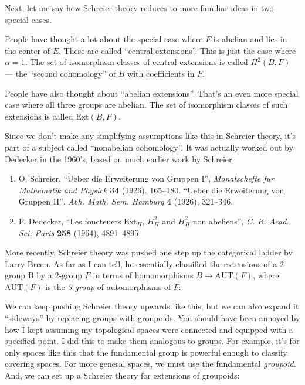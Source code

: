 \documentclass{article}
\def\tightlist{}
\renewcommand{\texttt}[1]{%
  \begingroup
  \ttfamily
  \begingroup\lccode`~=`/\lowercase{\endgroup\def~}{/\discretionary{}{}{}}%
  \begingroup\lccode`~=`[\lowercase{\endgroup\def~}{[\discretionary{}{}{}}%
  \begingroup\lccode`~=`.\lowercase{\endgroup\def~}{.\discretionary{}{}{}}%
  \catcode`/=\active\catcode`[=\active\catcode`.=\active
  \scantokens{#1\noexpand}%
  \endgroup
}
\begin{document}
Next, let me say how Schreier theory reduces to more familiar ideas in
two special cases.

People have thought a lot about the special case where \(F\) is abelian
and lies in the center of \(E\). These are called ``central
extensions''. This is just the case where \(\alpha = 1\). The set of
isomorphism classes of central extensions is called \(H^2(B,F)\) --- the
``second cohomology'' of \(B\) with coefficients in \(F\).

People have also thought about ``abelian extensions''. That's an even
more special case where all three groups are abelian. The set of
isomorphism classes of such extensions is called \(\mathrm{Ext}(B,F)\).

Since we don't make any simplifying assumptions like this in Schreier
theory, it's part of a subject called ``nonabelian cohomology''. It was
actually worked out by Dedecker in the 1960's, based on much earlier
work by Schreier:

\begin{enumerate}
\def\labelenumi{\arabic{enumi})}
\setcounter{enumi}{9}
\item
  O. Schreier, ``Ueber die Erweiterung von Gruppen I'',
  \emph{Monatschefte fur Mathematik and Physick} \textbf{34} (1926),
  165--180. ``Ueber die Erweiterung von Gruppen II'', \emph{Abh. Math.
  Sem. Hamburg} \textbf{4} (1926), 321--346.
\item
  P. Dedecker, ``Les foncteuers \(\mathrm{Ext}_\Pi\), \(H^2_\Pi\) and
  \(H^2_\Pi\) non abeliens'', \emph{C. R. Acad. Sci. Paris} \textbf{258}
  (1964), 4891--4895.
\end{enumerate}

More recently, Schreier theory was pushed one step up the categorical
ladder by Larry Breen. As far as I can tell, he essentially classified
the extensions of a \(2\)-group B by a \(2\)-group \(F\) in terms of
homomorphisms \(B \to \mathrm{AUT}(F)\), where \(\mathrm{AUT}(F)\) is
the \emph{3-group} of automorphisms of \(F\):


We can keep pushing Schreier theory upwards like this, but we can also
expand it ``sideways'' by replacing groups with groupoids. You should
have been annoyed by how I kept assuming my topological spaces were
connected and equipped with a specified point. I did this to make them
analogous to groups. For example, it's for only spaces like this that
the fundamental group is powerful enough to classify covering spaces.
For more general spaces, we must use the fundamental \emph{groupoid}.
And, we can set up a Schreier theory for extensions of groupoids:
\end{document}
